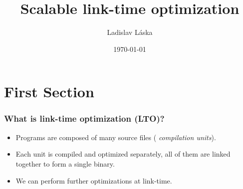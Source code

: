 \documentclass{beamer}
\title{Scalable link-time optimization} %
\author{Ladislav Láska} %
\institute[MFF UK] %
{
Faculty of Mathematics and Physics, Charles University \\ %
\medskip
\texttt{laska@kam.mff.cuni.cz} %
}
\date{\today} %
\begin{document}
\begin{frame}
\titlepage %
\end{frame}

\section{First Section} %


\begin{frame}[t]
	\frametitle{What is link-time optimization (LTO)?}
	\begin{itemize}
		\item<1-> Programs are composed of many source files ({\it
			compilation units}).
		\item<1-> Each unit is compiled and optimized separately, all of them are
			linked together to form a single binary.
		\item<2-> We can perform further optimizations at link-time.
	\end{itemize}
	\centering

\end{frame}
\end{document}
